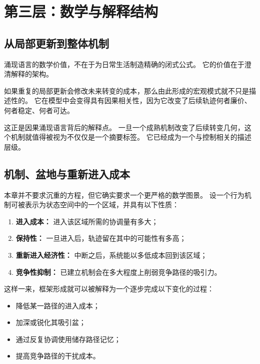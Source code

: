 \section{第三层：数学与解释结构}

\subsection{从局部更新到整体机制}

涌现语言的数学价值，不在于为日常生活制造精确的闭式公式。
它的价值在于澄清解释的架构。

\begin{proposition}[微观到宏观的反馈]
如果重复的局部更新会修改未来转变的成本，那么由此形成的宏观模式就不只是描述性的。
它在模型中会变得具有因果相关性，因为它改变了后续轨迹何者廉价、何者稳定、何者可达。
\end{proposition}

\begin{discussion}
这正是因果涌现语言背后的解释点。
一旦一个成熟机制改变了后续转变几何，这个机制就值得被视为不仅仅是一个摘要标签。
它已经成为一个与控制相关的描述层级。
\end{discussion}

\subsection{机制、盆地与重新进入成本}

本章并不要求沉重的方程，但它确实要求一个更严格的数学图景。
设一个行为机制可被表示为状态空间中的一个区域，并具有以下性质：
\begin{enumerate}[nosep]
  \item \textbf{进入成本：} 进入该区域所需的协调量有多大；
  \item \textbf{保持性：} 一旦进入后，轨迹留在其中的可能性有多高；
  \item \textbf{重新进入经济性：} 中断之后，系统能以多低成本回到该区域；
  \item \textbf{竞争性抑制：} 已建立机制会在多大程度上削弱竞争路径的吸引力。
\end{enumerate}

这样一来，框架形成就可以被解释为一个逐步完成以下变化的过程：
\begin{itemize}[nosep]
  \item 降低某一路径的进入成本；
  \item 加深或锐化其吸引盆；
  \item 通过反复协调使用储存路径记忆；
  \item 提高竞争路径的干扰成本。
\end{itemize}

